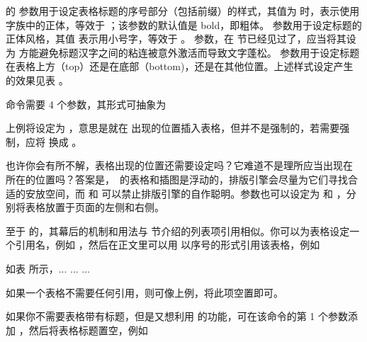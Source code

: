 \noindent {} 的  参数用于设定表格标题的序号部分（包括前缀）的样式，其值为  时，表示使用字族中的正体，等效于 ；该参数的默认值是 bold，即粗体。 参数用于设定标题的正体风格，其值  表示用小号字，等效于 。 参数，在 \in[essay] 节已经见过了，应当将其设为  方能避免标题汉字之间的粘连被意外激活而导致文字蓬松。 参数用于设定标题在表格上方（top）还是在底部（bottom)，还是在其他位置。上述样式设定产生的效果见表 。

\mainlanguage[cn]
\setupcaption
  [table]
  [headstyle=normal, style=\tfx, align=center, location=top]


 命令需要 4 个参数，其形式可抽象为

\startTEX
{}
\stopTEX

上例将设定为 ，意思是就在  出现的位置插入表格，但并不是强制的，若需要强制，应将  换成 。

也许你会有所不解，表格出现的位置还需要设定吗？它难道不是理所应当出现在  所在的位置吗？答案是，\CONTEXT\ 的表格和插图是浮动的，排版引擎会尽量为它们寻找合适的安放空间，而  和  可以禁止排版引擎的自作聪明。参数也可以设定为  和 ，分别将表格放置于页面的左侧和右侧。

至于  的，其幕后的机制和用法与 \in[itemcite] 节介绍的列表项引用相似。你可以为表格设定一个引用名，例如 ，然后在正文里可以用  以序号的形式引用该表格，例如

\startTEX
如表 \in[foo] 所示，... ... ...\par
{}
\stopTEX

\noindent 如果一个表格不需要任何引用，则可像上例，将此项空置即可。

如果你不需要表格带有标题，但是又想利用  的功能，可在该命令的第 1 个参数添加 ，然后将表格标题置空，例如

\blank[halfline]

